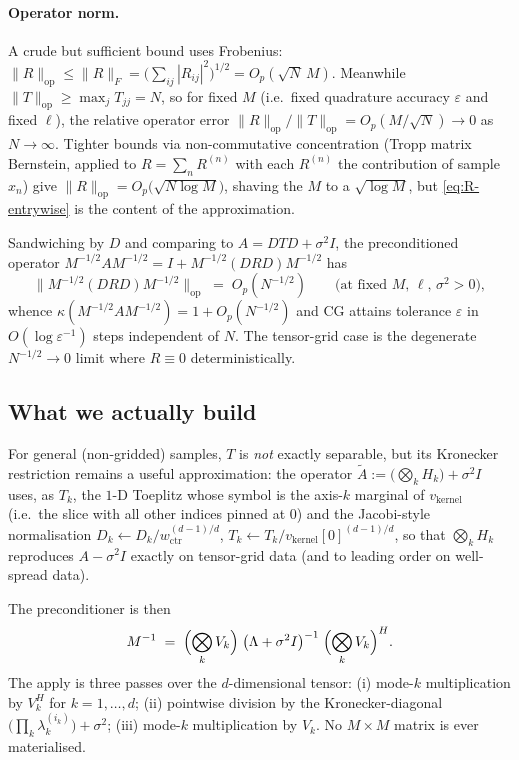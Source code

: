 \documentclass[11pt]{article}
\begin{document}
\paragraph{Operator norm.}
A crude but sufficient bound uses Frobenius:
$\|R\|_{\mathrm{op}} \le \|R\|_F = \bigl(\sum_{ij}|R_{ij}|^2\bigr)^{1/2} = O_p(\sqrt{N}\,M)$.
Meanwhile $\|T\|_{\mathrm{op}} \ge \max_j T_{jj} = N$, so for fixed $M$
(i.e.\ fixed quadrature accuracy $\varepsilon$ and fixed $\ell$), the
relative operator error
$\|R\|_{\mathrm{op}} / \|T\|_{\mathrm{op}} = O_p(M/\sqrt N) \to 0$
as $N\to\infty$. Tighter bounds via non-commutative concentration
(Tropp matrix Bernstein, applied to $R = \sum_n R^{(n)}$ with each
$R^{(n)}$ the contribution of sample $x_n$) give
$\|R\|_{\mathrm{op}} = O_p\!\bigl(\sqrt{N \log M}\bigr)$,
shaving the $M$ to a $\sqrt{\log M}$, but \eqref{eq:R-entrywise} is the
content of the approximation.

Sandwiching by $D$ and comparing to $A = DTD + \sigma^2 I$, the preconditioned
operator $M^{-1/2} A M^{-1/2} = I + M^{-1/2}(DRD) M^{-1/2}$ has
\[
  \bigl\|M^{-1/2}(DRD)M^{-1/2}\bigr\|_{\mathrm{op}} \;=\; O_p(N^{-1/2})
  \qquad \text{(at fixed $M$, $\ell$, $\sigma^2 > 0$)},
\]
whence $\kappa(M^{-1/2} A M^{-1/2}) = 1 + O_p(N^{-1/2})$ and CG attains
tolerance $\varepsilon$ in $O(\log \varepsilon^{-1})$ steps independent of
$N$. The tensor-grid case is the degenerate $N^{-1/2} \to 0$ limit where
$R \equiv 0$ deterministically.

\subsection{What we actually build}

For general (non-gridded) samples, $T$ is \emph{not} exactly separable, but
its Kronecker restriction remains a useful approximation: the operator
$\tilde A := \bigl(\bigotimes_k H_k\bigr) + \sigma^2 I$ uses, as
$T_k$, the $1$-D Toeplitz whose symbol is the axis-$k$ marginal of
$v_{\mathrm{kernel}}$ (i.e.\ the slice with all other indices pinned at
$0$) and the Jacobi-style normalisation
$D_k \gets D_k / w_{\mathrm{ctr}}^{(d-1)/d}$,
$T_k \gets T_k / v_{\mathrm{kernel}}[0]^{(d-1)/d}$,
so that $\bigotimes_k H_k$ reproduces $A - \sigma^2 I$ exactly on
tensor-grid data (and to leading order on well-spread data).

The preconditioner is then
\begin{equation}
  M^{-1} \;=\; \Bigl(\bigotimes_k V_k\Bigr)\;
              \bigl(\Lambda + \sigma^2 I\bigr)^{-1}\;
              \Bigl(\bigotimes_k V_k\Bigr)^H.
  \label{eq:precond}
\end{equation}
The apply is three passes over the $d$-dimensional tensor:
(i) mode-$k$ multiplication by $V_k^H$ for $k=1,\ldots,d$;
(ii) pointwise division by the Kronecker-diagonal
$\bigl(\prod_k \lambda_k^{(i_k)}\bigr) + \sigma^2$;
(iii) mode-$k$ multiplication by $V_k$. No $M\times M$ matrix is ever
materialised.
\end{document}
